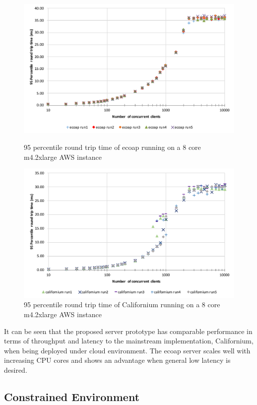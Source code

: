 \begin{figure}[!htbp]
\centering
\includegraphics[scale = 0.8]{ecoap_95p_round_trip_time}
\caption{95 percentile round trip time of ecoap running on a 8 core m4.2xlarge AWS instance}
\label{fig:ecoap_95p_round_trip_time}
\includegraphics[scale = 0.8]{californium_95p_round_trip_time}
\caption{95 percentile round trip time of Californium running on a 8 core m4.2xlarge AWS instance}
\label{fig:californium_95p_round_trip_time}
\end{figure}

It can be seen that the proposed server prototype has comparable performance in terms of throughput and latency to the mainstream implementation, Californium, when being deployed  under cloud environment. The ecoap server scales well with increasing CPU cores and shows an advantage when general low latency is desired.

\subsection{Constrained Environment}

